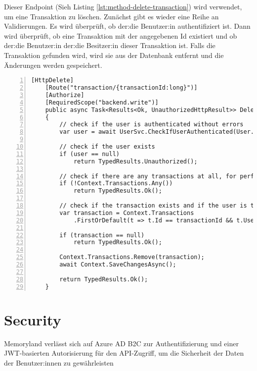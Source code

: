 Dieser Endpoint (Sieh Listing \ref{lst:method-delete-transaction}) wird verwendet, um eine Transaktion zu löschen. Zunächst gibt es wieder eine
Reihe an Validierungen. Es wird überprüft, ob der:die Benutzer:in authentifiziert ist. 
Dann wird überprüft, ob eine Transaktion mit der angegebenen Id existiert und ob der:die 
Benutzer:in der:die Besitzer:in dieser Transaktion ist. Falls die Transaktion gefunden 
wird, wird sie aus der Datenbank entfernt und die Änderungen werden gespeichert.

\begin{lstlisting}[numbers=left,caption={Methode DeleteTransactionById},label={lst:method-delete-transaction}]
    [HttpDelete]
    [Route("transaction/{transactionId:long}")]
    [Authorize]
    [RequiredScope("backend.write")]
    public async Task<Results<Ok, UnauthorizedHttpResult>> DeleteTransactionById(long transactionId)
    {
        // check if the user is authenticated without errors
        var user = await UserSvc.CheckIfUserAuthenticated(User.Claims);
        
        // check if the user exists
        if (user == null)
            return TypedResults.Unauthorized();
        
        // check if there are any transactions at all, for performance
        if (!Context.Transactions.Any()) 
            return TypedResults.Ok();
        
        // check if the transaction exists and if the user is the owner
        var transaction = Context.Transactions
            .FirstOrDefault(t => t.Id == transactionId && t.UserId == user.Id);
        
        if (transaction == null)
            return TypedResults.Ok();
        
        Context.Transactions.Remove(transaction);
        await Context.SaveChangesAsync();
            
        return TypedResults.Ok();
    }

\end{lstlisting}


\section{Security}
\label{sec:security}

Memoryland verlässt sich auf Azure AD B2C zur Authentifizierung und einer 
JWT-basierten Autorisierung für den API-Zugriff, um die Sicherheit der Daten
der Benutzer:innen zu gewährleisten

